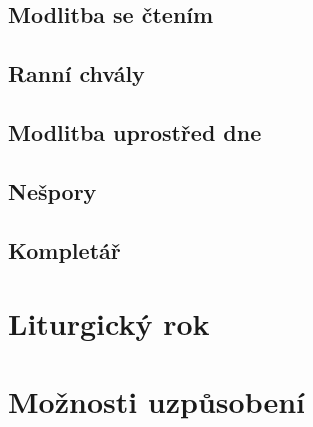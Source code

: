 \documentclass[a5paper, twoside]{article}
\begin{document}
\subsection{Modlitba se čtením}
\subsection{Ranní chvály}
\subsection{Modlitba uprostřed dne}
\subsection{Nešpory}
\subsection{Kompletář}

\section{Liturgický rok}

\section{Možnosti uzpůsobení}
\end{document}
